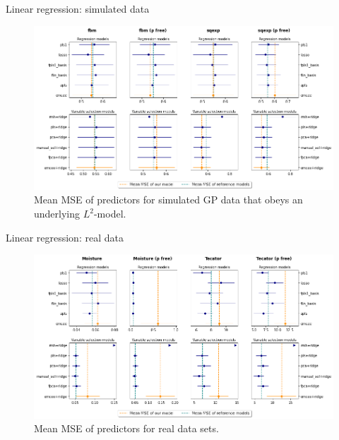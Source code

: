 \documentclass[10pt, english, professionalfonts]{beamer}
\begin{document}
\begin{frame}{Linear regression: simulated data}
  \vspace{1em}
  \begin{figure}
    \includegraphics[width=\textwidth]{img/reg_emcee_l2}
    \caption{Mean MSE of predictors for simulated GP data that obeys an underlying \(L^2\)-model.}
  \end{figure}
\end{frame}

\begin{frame}{Linear regression: real data}
    \vspace{1em}
  \begin{figure}
    \includegraphics[width=\textwidth]{img/reg_emcee_real}
    \caption{Mean MSE of predictors for real data sets.}
  \end{figure}
\end{frame}
\end{document}
